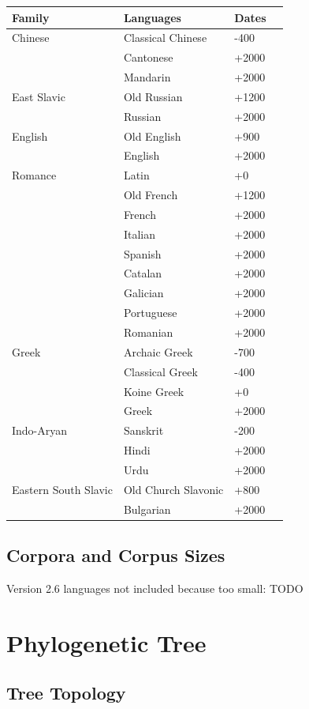 \documentclass[11pt,a4paper]{article}
\begin{document}
\begin{tabular}{llll} \hline
Family & Languages & Dates \\ \hline\hline
Chinese & Classical Chinese & -400  \\
& Cantonese & +2000\\ 
& Mandarin & +2000 \\ \hline
East Slavic & Old Russian & +1200 \\
& Russian & +2000 \\ \hline
English & Old English & +900 \\
& English  & +2000\\ \hline
Romance & Latin &+0  \\
& Old French &+1200\\
& French  & +2000\\
& Italian & +2000\\
& Spanish & +2000\\
& Catalan & +2000\\
& Galician & +2000\\
& Portuguese & +2000\\
& Romanian & +2000\\ \hline
Greek & Archaic Greek & -700 \\
      & Classical Greek & -400 \\
      & Koine Greek & +0\\
& Greek  & +2000\\ \hline
Indo-Aryan & Sanskrit & -200 \\
& Hindi  & +2000\\
& Urdu  & +2000\\ \hline
Eastern South Slavic & Old Church Slavonic & +800 \\
& Bulgarian  & +2000\\ \hline
\end{tabular}


\subsection{Corpora and Corpus Sizes}

Version 2.6 languages not included because too small: TODO

\section{Phylogenetic Tree}

\subsection{Tree Topology}
\end{document}
